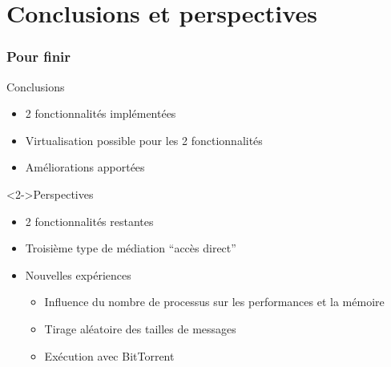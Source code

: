 \documentclass[10.5pt]{beamer}
\begin{document}
\section{Conclusions et perspectives}
\begin{frame}
  \frametitle{Pour finir}
  \begin{alertblock}{Conclusions}
    \begin{itemize}
    \item 2 fonctionnalités implémentées
    \item Virtualisation possible pour les 2 fonctionnalités
    \item Améliorations apportées
    \end{itemize}
  \end{alertblock}
  \begin{alertblock}<2->{Perspectives}
    \begin{itemize}
    \item 2 fonctionnalités restantes
    \item Troisième type de médiation ``accès direct''
    \item Nouvelles expériences
      \begin{itemize}
      \item Influence du nombre de processus sur les performances et la mémoire
      \item Tirage aléatoire des tailles de messages
      \item Exécution avec BitTorrent
      \end{itemize}
    \end{itemize}
  \end{alertblock}
\end{frame}

\end{document}
